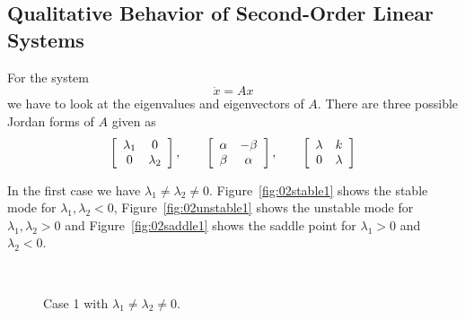 \subsection{Qualitative Behavior of Second-Order Linear Systems}
For the system
$$\dot{x} = Ax$$
we have to look at the eigenvalues and eigenvectors of $A$.
There are three possible Jordan forms of $A$ given as
\begin{align*}
\left[\begin{array}{c c} \lambda_1 & 0 \\ 0 & \lambda_2 \end{array}\right], \qquad
\left[\begin{array}{c c} \alpha & -\beta \\ \beta & \alpha \end{array}\right], \qquad
\left[\begin{array}{c c} \lambda & k \\ 0 & \lambda \end{array}\right]
\end{align*}

In the first case we have $\lambda_1\neq\lambda_2\neq0$.
Figure~\ref{fig:02stable1} shows the stable mode for $\lambda_1, \lambda_2<0$, Figure~\ref{fig:02unstable1} shows the unstable mode for $\lambda_1, \lambda_2>0$ and Figure~\ref{fig:02saddle1} shows the saddle point for $\lambda_1>0$ and $\lambda_2<0$.

\begin{figure}[ht!]
\centering
{} \hfill
{} \\
\caption{Case 1 with $\lambda_1\neq\lambda_2\neq0$.}
\label{fig:02case1}
\end{figure}

